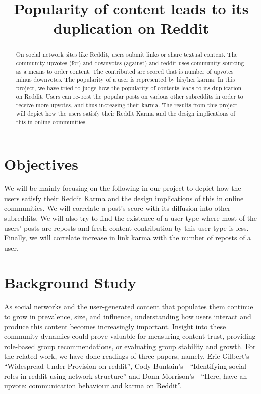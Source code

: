 \documentclass{article} %
\title{Popularity of content leads to its duplication on Reddit}
\begin{document}
\maketitle

\begin{abstract}
On social network sites like Reddit, users submit links or share textual content. The community upvotes (for) and downvotes (against) and reddit uses community sourcing as a means to order content. The contributed are scored that is number of upvotes minus downvotes. The popularity of a user is represented by his/her karma. In this project, we have tried to judge how the popularity of contents leads to its duplication on Reddit. Users can re-post the popular posts on various other subreddits in order to receive more upvotes, and thus increasing their karma. The results from this project will depict  how the users satisfy their Reddit Karma and the design implications of this in online communities.
\end{abstract}

\section{Objectives}
We will be mainly focusing on the following in our project to depict how the users satisfy their Reddit Karma and the design implications of this in online communities. We will correlate a post's score with its diffusion into other subreddits. We will also try to find the existence of a user type where most of the users' posts are reposts and fresh content contribution by this user type is less. Finally, we will correlate increase in link karma with the number of reposts of a user.

\section{Background Study}

As social networks and the user-generated content that populates them continue to grow in prevalence, size, and influence, understanding how users interact and produce this content becomes increasingly important. Insight into these community dynamics could prove valuable for measuring content trust, providing role-based group recommendations, or evaluating group stability and growth. For the related work, we have done readings of three papers, namely, Eric Gilbert's - ``Widespread Under Provision on reddit'', Cody Buntain's - ``Identifying social roles in reddit using network structure'' and Donn Morrison's - ``Here, have an upvote: communication behaviour and karma on Reddit''.
\end{document}
